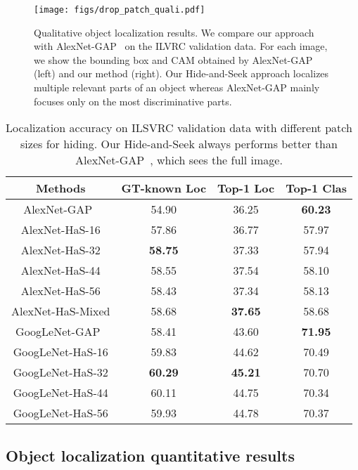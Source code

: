 \documentclass[10pt,twocolumn,letterpaper]{article}
\begin{document}
\begin{figure*}[t!]
\centering
    \texttt{[image: figs/drop\_patch\_quali.pdf]}
    \caption{Qualitative object localization results.  We compare our approach with AlexNet-GAP~\cite{zhou-cvpr2016} on the ILVRC validation data. For each image, we show the bounding box and CAM obtained by AlexNet-GAP (left) and our method (right).  Our Hide-and-Seek approach localizes multiple relevant parts of an object whereas AlexNet-GAP mainly focuses only on the most discriminative parts.}
    \vspace*{-0.12in}
\label{fig:qualresults}
\end{figure*}\begin{table}[t!]
\begin{center}
    \footnotesize
    \begin{tabular}{| c | c | c| c|}
    	
    \hline    	
    Methods & GT-known Loc &  Top-1 Loc  & Top-1 Clas   \\
    \hline
    
    AlexNet-GAP~\cite{zhou-cvpr2016}  &  54.90\footnotemark[2] & 36.25 & \textbf{60.23}\\
    AlexNet-HaS-16     & 57.86 & 36.77 & 57.97  \\
    AlexNet-HaS-32            & \textbf{58.75} & 37.33 & 57.94 \\
    AlexNet-HaS-44            & 58.55 & 37.54 & 58.10 \\
    AlexNet-HaS-56            & 58.43 & 37.34 & 58.13  \\
    AlexNet-HaS-Mixed       & 58.68 & \textbf{37.65} & 58.68 \\
   

            \hline
     GoogLeNet-GAP~\cite{zhou-cvpr2016}  & 58.41\footnotemark[2] & 43.60 & \textbf{71.95}  \\
     GoogLeNet-HaS-16            & 59.83 & 44.62 & 70.49 \\
                GoogLeNet-HaS-32            &  \textbf{60.29} & \textbf{45.21} & 70.70 \\
                GoogLeNet-HaS-44          & 60.11 & 44.75 & 70.34  \\
                GoogLeNet-HaS-56            & 59.93 & 44.78 & 70.37  \\
                \hline

    \end{tabular}
    \caption{Localization accuracy on ILSVRC validation data with different patch sizes for hiding.  Our Hide-and-Seek always performs better than AlexNet-GAP~\cite{zhou-cvpr2016}, which sees the full image.}
    \label{table:patch_size_results}
\end{center}
\vspace*{-0.15in}
\end{table}\subsection{Object localization quantitative results}
\end{document}

